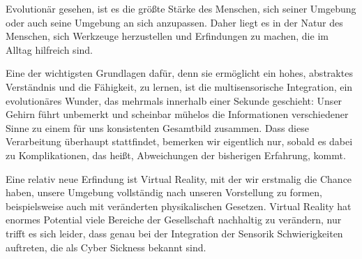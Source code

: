 Evolution\"ar gesehen, ist es die gr\"o{\ss}te St\"arke des Menschen, sich seiner Umgebung oder auch seine Umgebung an sich anzupassen. Daher liegt es in der Natur des Menschen, sich Werkzeuge herzustellen und Erfindungen zu machen, die im Alltag hilfreich sind.

Eine der wichtigsten Grundlagen daf\"ur, denn sie erm\"oglicht ein hohes, abstraktes Verst\"andnis und die F\"ahigkeit, zu lernen, ist die multisensorische Integration, ein evolution\"ares Wunder, das mehrmals innerhalb einer Sekunde geschieht: Unser Gehirn f\"uhrt unbemerkt und scheinbar m\"uhelos die Informationen verschiedener Sinne zu einem f\"ur uns konsistenten Gesamtbild zusammen.
Dass diese Verarbeitung \"uberhaupt stattfindet, bemerken wir eigentlich nur, sobald es dabei zu Komplikationen, das hei{\ss}t, Abweichungen der bisherigen Erfahrung, kommt. 

Eine relativ neue Erfindung ist Virtual Reality, mit der wir erstmalig die Chance haben, unsere Umgebung vollst\"andig nach unseren Vorstellung zu formen, beispielsweise auch mit ver\"anderten physikalischen Gesetzen.
Virtual Reality hat enormes Potential viele Bereiche der Gesellschaft nachhaltig zu ver\"andern, nur trifft es sich leider, dass genau bei der Integration der Sensorik Schwierigkeiten auftreten, die als Cyber Sickness bekannt sind.